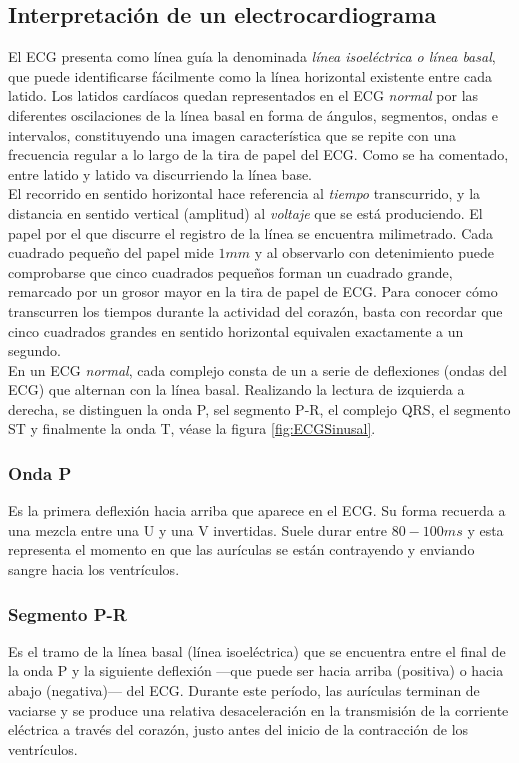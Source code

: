 \documentclass[12pt,letterpaper,oneside,openright]{book}
\begin{document}
\subsection{Interpretación de un electrocardiograma}

El ECG presenta como línea guía la denominada \textit{línea isoeléctrica o línea basal}, que puede identificarse fácilmente como la línea horizontal existente entre cada latido. Los latidos cardíacos quedan representados en el ECG \textit{normal} por las diferentes oscilaciones de la línea basal en forma de ángulos, segmentos, ondas e intervalos, constituyendo una imagen característica que se repite con una frecuencia regular a lo largo de la tira de papel del ECG. Como se ha comentado, entre latido y latido va discurriendo la línea base. \\
El recorrido en sentido horizontal hace referencia al \textit{tiempo} transcurrido, y la distancia en sentido vertical (amplitud) al \textit{voltaje} que se está produciendo. El papel por el que discurre el registro de la línea se encuentra milimetrado. Cada cuadrado pequeño del papel mide $1 mm$ y al observarlo con detenimiento puede comprobarse que cinco cuadrados pequeños forman un cuadrado grande, remarcado por un grosor mayor en la tira de papel de ECG. Para conocer cómo transcurren los tiempos durante la actividad del corazón, basta con recordar que cinco cuadrados grandes en sentido horizontal equivalen exactamente a un segundo. \\
En un ECG \textit{normal}, cada complejo consta de un a serie de deflexiones (ondas del ECG) que alternan con la línea basal. Realizando la lectura de izquierda a derecha, se distinguen la onda P, sel segmento P-R, el complejo QRS, el segmento ST y finalmente la onda T, véase la figura \ref{fig:ECGSinusal}.
\subsubsection{Onda P}

Es la primera deflexión hacia arriba que aparece en el ECG. Su forma recuerda a una mezcla entre una U y una V invertidas. Suele durar entre $80-100 ms$ y esta representa el momento en que las aurículas se están contrayendo y enviando sangre hacia los ventrículos. 

\subsubsection{Segmento P-R}

Es el tramo de la línea basal (línea isoeléctrica) que se encuentra entre el final de la onda P y la siguiente deflexión ---que puede ser hacia arriba (positiva) o hacia abajo (negativa)--- del ECG. Durante este período, las aurículas terminan de vaciarse y se produce una relativa desaceleración en la transmisión de la corriente eléctrica a través del corazón, justo antes del inicio de la contracción de los ventrículos. 
\end{document}
